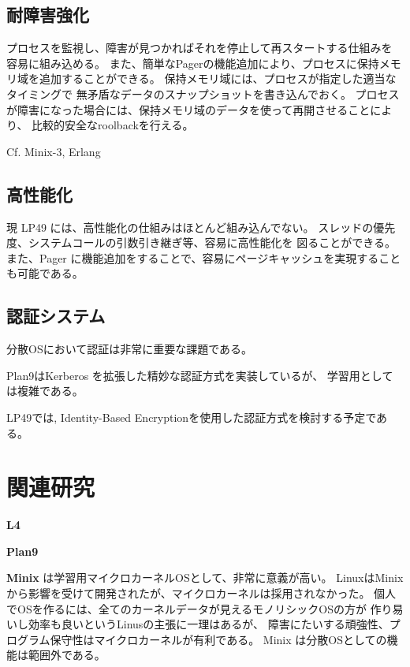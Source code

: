 \documentclass[draft]{ipsjpapers}
\begin{document}
\subsection{耐障害強化}

プロセスを監視し、障害が見つかればそれを停止して再スタートする仕組みを
容易に組み込める。
また、簡単なPagerの機能追加により、プロセスに保持メモリ域を追加することができる。
保持メモリ域には、プロセスが指定した適当なタイミングで
無矛盾なデータのスナップショットを書き込んでおく。
プロセスが障害になった場合には、保持メモリ域のデータを使って再開させることにより、
比較的安全なroolbackを行える。

Cf. Minix-3, Erlang



\subsection{高性能化}
 
現 LP49 には、高性能化の仕組みはほとんど組み込んでない。
スレッドの優先度、システムコールの引数引き継ぎ等、容易に高性能化を
図ることができる。
また、Pager に機能追加をすることで、容易にページキャッシュを実現することも可能である。



\subsection{認証システム}

分散OSにおいて認証は非常に重要な課題である。

Plan9はKerberos を拡張した精妙な認証方式を実装しているが、
学習用としては複雑である。

LP49では,
Identity-Based Encryptionを使用した認証方式を検討する予定である。




\section{関連研究}

{\bf L4}


{\bf Plan9} 

{\bf Minix} は学習用マイクロカーネルOSとして、非常に意義が高い。
LinuxはMinixから影響を受けて開発されたが、マイクロカーネルは採用されなかった。
個人でOSを作るには、全てのカーネルデータが見えるモノリシックOSの方が
作り易いし効率も良いというLinusの主張に一理はあるが、
障害にたいする頑強性、プログラム保守性はマイクロカーネルが有利である。
Minix は分散OSとしての機能は範囲外である。
\end{document}
